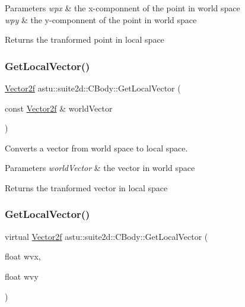 \begin{DoxyParams}{Parameters}
{\em wpx} & the x-\/componnent of the point in world space \\
\hline
{\em wpy} & the y-\/componnent of the point in world space \\
\hline
\end{DoxyParams}
\begin{DoxyReturn}{Returns}
the tranformed point in local space 
\end{DoxyReturn}
\mbox{\label{classastu_1_1suite2d_1_1CBody_a0a03263c71e5d82a26b7e20f5cf99d5d}} 
\subsubsection{\texorpdfstring{Get\+Local\+Vector()}{GetLocalVector()}\hspace{0.1cm}{\footnotesize\ttfamily [1/2]}}
{\footnotesize\ttfamily \hyperlink{classastu_1_1Vector2}{Vector2f} astu\+::suite2d\+::\+C\+Body\+::\+Get\+Local\+Vector (\begin{DoxyParamCaption}\item[{const \hyperlink{classastu_1_1Vector2}{Vector2f} \&}]{world\+Vector }\end{DoxyParamCaption})\hspace{0.3cm}{\ttfamily [inline]}}

Converts a vector from world space to local space.


\begin{DoxyParams}{Parameters}
{\em world\+Vector} & the vector in world space \\
\hline
\end{DoxyParams}
\begin{DoxyReturn}{Returns}
the tranformed vector in local space 
\end{DoxyReturn}
\mbox{\label{classastu_1_1suite2d_1_1CBody_a9c1d354449c29648dc07640c7853c37d}} 
\subsubsection{\texorpdfstring{Get\+Local\+Vector()}{GetLocalVector()}\hspace{0.1cm}{\footnotesize\ttfamily [2/2]}}
{\footnotesize\ttfamily virtual \hyperlink{classastu_1_1Vector2}{Vector2f} astu\+::suite2d\+::\+C\+Body\+::\+Get\+Local\+Vector (\begin{DoxyParamCaption}\item[{float}]{wvx,  }\item[{float}]{wvy }\end{DoxyParamCaption})\hspace{0.3cm}{\ttfamily [pure virtual]}}

